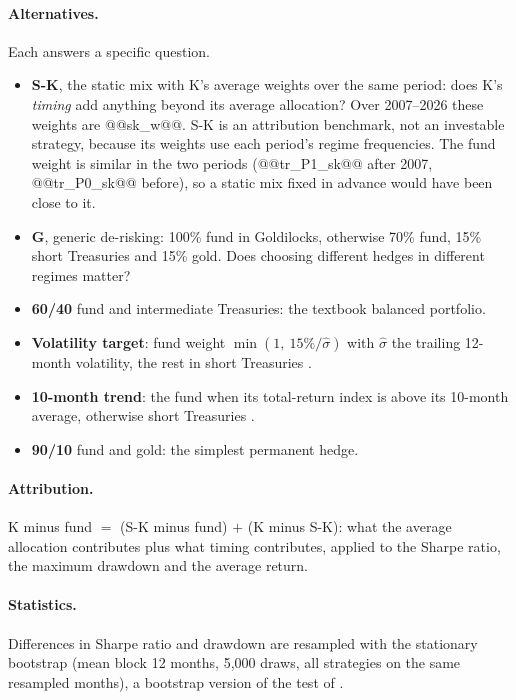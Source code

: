 \documentclass[11pt,a4paper]{article}
\begin{document}
\paragraph{Alternatives.} Each answers a specific question.
\begin{itemize}
\item \textbf{S-K}, the static mix with K's average weights over the same period: does K's \emph{timing} add
anything beyond its average allocation? Over 2007--2026 these weights are @@sk_w@@. S-K is an attribution
benchmark, not an investable strategy, because its weights use each period's regime frequencies. The fund weight
is similar in the two periods (@@tr_P1_sk@@ after 2007, @@tr_P0_sk@@ before), so a static mix fixed in advance would
have been close to it.
\item \textbf{G}, generic de-risking: 100\% fund in Goldilocks, otherwise 70\% fund, 15\% short Treasuries and 15\%
gold. Does choosing different hedges in different regimes matter?
\item \textbf{60/40} fund and intermediate Treasuries: the textbook balanced portfolio.
\item \textbf{Volatility target}: fund weight $\min(1,\ 15\%/\hat\sigma)$ with $\hat\sigma$ the trailing 12-month
volatility, the rest in short Treasuries \citep{moreira2017}.
\item \textbf{10-month trend}: the fund when its total-return index is above its 10-month average, otherwise short
Treasuries \citep{faber2007,moskowitz2012}.
\item \textbf{90/10} fund and gold: the simplest permanent hedge.
\end{itemize}

\paragraph{Attribution.} K minus fund $=$ (S-K minus fund) $+$ (K minus S-K): what the average allocation
contributes plus what timing contributes, applied to the Sharpe ratio, the maximum drawdown and the average
return.

\paragraph{Statistics.} Differences in Sharpe ratio and drawdown are resampled with the stationary bootstrap
\citep{politis1994} (mean block 12 months, 5{,}000 draws, all strategies on the same resampled months), a
bootstrap version of the test of \citet{ledoit2008}.
\end{document}
